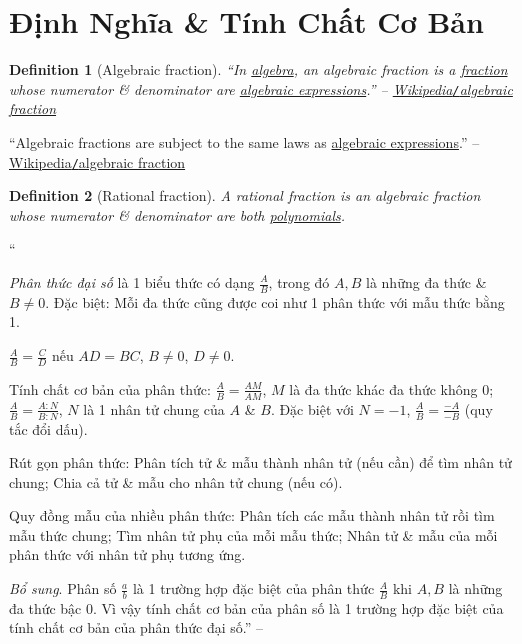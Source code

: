 \documentclass{article}
\numberwithin{equation}{section}
\newtheorem{definition}{Definition}[section]
\begin{document}
\section{Định Nghĩa \& Tính Chất Cơ Bản}

\begin{definition}[Algebraic fraction]
	``In \href{https://en.wikipedia.org/wiki/Algebra}{algebra}, an \emph{algebraic fraction} is a \href{https://en.wikipedia.org/wiki/Fraction_(mathematics)}{fraction} whose numerator \& denominator are \href{https://en.wikipedia.org/wiki/Algebraic_expression}{algebraic expressions}.'' -- \href{https://en.wikipedia.org/wiki/Algebraic_fraction}{Wikipedia\emph{\texttt{/}}algebraic fraction}
\end{definition}
``Algebraic fractions are subject to the same laws as \href{https://en.wikipedia.org/wiki/Arithmetic_fraction}{algebraic expressions}.'' -- \href{https://en.wikipedia.org/wiki/Algebraic_fraction}{Wikipedia\texttt{/}algebraic fraction}

\begin{definition}[Rational fraction]
	A \emph{rational fraction} is an algebraic fraction whose numerator \& denominator are both \href{https://en.wikipedia.org/wiki/Polynomial}{polynomials}.
\end{definition}
``\begin{enumerate*}
	\item[\textbf{1.}] \textit{Phân thức đại số} là 1 biểu thức có dạng $\frac{A}{B}$, trong đó $A,B$ là những đa thức \& $B\ne 0$. Đặc biệt: Mỗi đa thức cũng được coi như 1 phân thức với mẫu thức bằng 1.
	\item[\textbf{2.}] $\frac{A}{B} = \frac{C}{D}$ nếu $AD = BC$, $B\ne 0$, $D\ne 0$.
	\item[\textbf{3.}] Tính chất cơ bản của phân thức: $\frac{A}{B} = \frac{AM}{AM}$, $M$ là đa thức khác đa thức không 0; $\frac{A}{B} = \frac{A:N}{B:N}$, $N$ là 1 nhân tử chung của $A$ \& $B$. Đặc biệt với $N = -1$, $\frac{A}{B} = \frac{-A}{-B}$ (quy tắc đổi dấu).
	\item[\textbf{4.}] Rút gọn phân thức: Phân tích tử \& mẫu thành nhân tử (nếu cần) để tìm nhân tử chung; Chia cả tử \& mẫu cho nhân tử chung (nếu có).
	\item[\textbf{5.}] Quy đồng mẫu của nhiều phân thức: Phân tích các mẫu thành nhân tử rồi tìm mẫu thức chung; Tìm nhân tử phụ của mỗi mẫu thức; Nhân tử \& mẫu của mỗi phân thức với nhân tử phụ tương ứng.
\end{enumerate*}

\textit{Bổ sung}. Phân số $\frac{a}{b}$ là 1 trường hợp đặc biệt của phân thức $\frac{A}{B}$ khi $A,B$ là những đa thức bậc 0. Vì vậy tính chất cơ bản của phân số là 1 trường hợp đặc biệt của tính chất cơ bản của phân thức đại số.'' -- \cite[pp. 37--38]{Tuyen_Toan_8}
\end{document}

